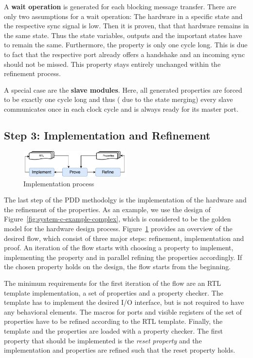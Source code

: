 A \textbf{wait operation} is generated for each blocking message transfer. 
There are only two assumptions for a wait operation: The hardware in a specific state and the respective sync signal is low. 
Then it is proven, that that hardware remains in the same state.
Thus the state variables, outputs and the important states have to remain the same. 
Furthermore, the property is only one cycle long.
This is due to fact that the respective port already offers a handshake and an incoming sync should not be missed. 
This property stays entirely unchanged within the refinement process. 

A special case are the \textbf{slave modules}. 
Here, all generated properties are forced to be exactly one cycle long and thus ( due to the state merging) every slave communicates once in each clock cycle and is always ready for its master port. 


\subsection{Step 3: Implementation and Refinement}
\begin{figure}
	\vspace{-20pt}
    \caption{Implementation process}
    \label{fig:step3_detail}
    \includegraphics[width=0.5\textwidth]{fig/step3_detail.pdf}
    \vspace{-20pt}
\end{figure}

The last step of the PDD methodolgy is the implementation of the hardware and the refinement of the properties. 
As an example, we use the design of Figure~\ref{fig:system-c-example-complex}, which is considered to be the golden model for the hardware design process. 
Figure~\ref{fig:step3_detail} provides an overview of the desired flow, which consist of three major steps: refinement, implementation and proof. 
An iteration of the flow starts with choosing a property to implement, implementing the property and in parallel refining the properties accordingly. 
If the chosen property holds on the design, the flow starts from the beginning. 
 
The minimum requirements for the first iteration of the flow are an RTL template implementation, a set of properties and a property checker. 
The template has to implement the desired I/O interface, but is not required to have any behavioral elements. 
The macros for ports and visible registers of the set of properties have to be refined according to the RTL template.  
Finally, the template and the properties are loaded with a property checker. 
The first property that should be implemented is the \textit{reset property} and the implementation and properties are refined such that the reset property holds.  

